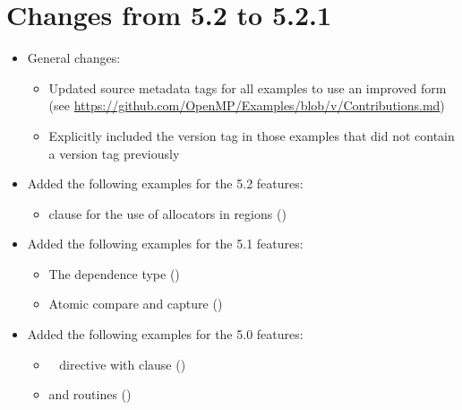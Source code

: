 \label{chap:history}

\section{Changes from 5.2 to 5.2.1}
\label{sec:history_52_to_521}

\begin{itemize}
\item General changes:
\begin{itemize}
\item Updated source metadata tags for all examples to use an improved form
 (see \href{https://github.com/OpenMP/Examples/blob/v\VER/Contributions.md}%
 {https://github.com/OpenMP/Examples/blob/v\VER/Contributions.md})
\item Explicitly included the version tag  in those 
 examples that did not contain a version tag previously
\end{itemize}

\item Added the following examples for the 5.2 features:
\begin{itemize}
  \item {} clause for the use of allocators in 
   regions ()
\end{itemize}
\item Added the following examples for the 5.1 features:
\begin{itemize}
  \item The  dependence type ()
  \item Atomic compare and capture ()
\end{itemize}
\item Added the following examples for the 5.0 features:
\begin{itemize}
  \item {}~ directive with 
     clause ()
  \item {} and 
     routines ()
\end{itemize}


\end{itemize}
